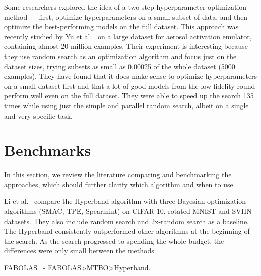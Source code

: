 Some researchers explored the idea of a two-step hyperparameter optimization method --- first, optimize hyperparameters on a small subset of data, and then optimize the best-performing models on the full dataset. This approach was recently studied by Yu et al.~\cite{yu2024two} on a large dataset for aerosol activation emulator, containing almost 20 million examples. Their experiment is interesting because they use random search as an optimization algorithm and focus just on the dataset sizes, trying subsets as small as 0.00025 of the whole dataset (5000 examples). They have found that it does make sense to optimize hyperparameters on a small dataset first and that a lot of good models from the low-fidelity round perform well even on the full dataset. They were able to speed up the search 135 times while using just the simple and parallel random search, albeit on a single and very specific task.



\section{Benchmarks}
In this section, we review the literature comparing and benchmarking the approaches, which should further clarify which algorithm and when to use.


Li et al.~\cite{li2018hyperband} compare the Hyperband algorithm with three Bayesian optimization algorithms (SMAC, TPE, Spearmint) on CIFAR-10, rotated MNIST and SVHN datasets. They also include random search and 2x-random search as a baseline. The Hyperband consistently outperformed other algorithms at the beginning of the search. As the search progressed to spending the whole budget, the differences were only small between the methods.

FABOLAS~\cite{klein2017fast} - FABOLAS>MTBO>Hyperband.